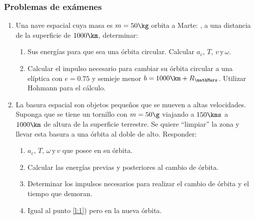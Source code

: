 \subsubsection*{Problemas de exámenes}
\begin{enumerate}
  \item Una nave espacial cuya masa es \( m=50\kg \) orbita a Marte: \Mars, a
    una distancia de la superficie de \(1000\km\), determinar:
    \begin{enumerate}
      \item Sus energías para que sea una órbita circular. Calcular \( a_c,\,
	T,\, v\,\mathrm{ y }\, \omega \).
      \item Calcular el impulso necesario para cambiar su órbita circular a una
	elíptica con \( e=0.75 \) y semieje menor \( b=1000\km + R_\mathMars \).
	Utilizar Hohmann para el cálculo.
    \end{enumerate}

  \item La basura espacial son objetos pequeños que se mueven a altas
    velocidades. Suponga que se tiene un tornillo con \( m=50\g \) viajando a
    \( 150\kms \) a \( 1000\km \) de altura de la superficie terrestre. Se
    quiere ``limpiar'' la zona y llevar esta basura a una órbita al doble de
    alto. Responder:
    \begin{enumerate}
      \item\label{l:1} \( a_c,\, T,\, \omega\,\mathrm{ y }\, v \) que posee en su órbita.
      \item Calcular las energías previas y posteriores al cambio de órbita.
      \item Determinar los impulsos necesarios para realizar el cambio de órbita
	y el tiempo que demoran.
      \item Igual al punto \ref{l:1}) pero en la nueva órbita.
    \end{enumerate}


\end{enumerate}
\normalsize
 





\clearpage

\printbibliography

\clearpage





